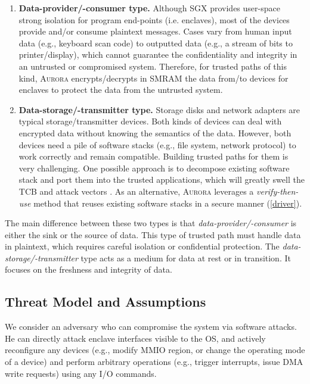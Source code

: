 \documentclass[journal,twocolumn,letterpaper,10pt]{IEEEtran}
\begin{document}
\begin{enumerate}

\item \textbf{Data-provider/-consumer type.}
Although SGX provides user-space strong isolation for program end-points (i.e. enclaves), most of the devices provide and/or consume plaintext messages. Cases vary from human input data (e.g., keyboard scan code) to outputted data (e.g., a stream of bits to printer/display), which cannot guarantee the confidentiality and integrity in an untrusted or compromised system. Therefore, for trusted paths of this kind, \textsc{Aurora} encrypts/decrypts in SMRAM the data from/to devices for enclaves to protect the data from the untrusted system.

\item \textbf{Data-storage/-transmitter type.} Storage disks and network adapters are typical storage/transmitter devices. Both kinds of devices can deal with encrypted data without knowing the semantics of the data. However, both devices need a pile of software stacks (e.g., file system, network protocol) to work correctly and remain compatible. Building trusted paths for them is very challenging. One possible approach is to decompose existing software stack and port them into the trusted applications, which will greatly swell the TCB and attack vectors \cite{weiser_sgxio:_2017}. As an alternative, \textsc{Aurora} leverages a \emph{verify-then-use} method that reuses existing software stacks in a secure manner (\autoref{driver}).

\end{enumerate}

The main difference between these two types is that \textit{data-provider/-consumer} is either the sink or the source of data. This type of trusted path must handle data in plaintext, which requires careful isolation or confidential protection. The \textit{data-storage/-transmitter} type acts as a medium for data at rest or in transition. It focuses on the freshness and integrity of data.

\subsection{Threat Model and Assumptions}
We consider an adversary who can compromise the system via software attacks. He can directly attack enclave interfaces visible to the OS, and actively reconfigure any devices (e.g., modify MMIO region, or change the operating mode of a device) and perform arbitrary operations (e.g., trigger interrupts, issue DMA write requests) using any I/O commands.
\end{document}
